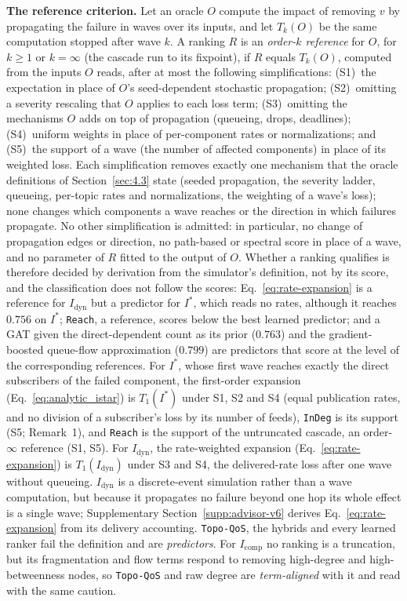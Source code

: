 \noindent\textbf{The reference criterion.} Let an oracle $O$ compute the impact of removing $v$ by propagating the failure in waves over its inputs, and let $T_k(O)$ be the same computation stopped after wave $k$. A ranking $R$ is an \emph{order-$k$ reference} for $O$, for $k \ge 1$ or $k = \infty$ (the cascade run to its fixpoint), if $R$ equals $T_k(O)$, computed from the inputs $O$ reads, after at most the following simplifications: (S1)~the expectation in place of $O$'s seed-dependent stochastic propagation; (S2)~omitting a severity rescaling that $O$ applies to each loss term; (S3)~omitting the mechanisms $O$ adds on top of propagation (queueing, drops, deadlines); (S4)~uniform weights in place of per-component rates or normalizations; and (S5)~the support of a wave (the number of affected components) in place of its weighted loss. Each simplification removes exactly one mechanism that the oracle definitions of Section~\ref{sec:4.3} state (seeded propagation, the severity ladder, queueing, per-topic rates and normalizations, the weighting of a wave's loss); none changes which components a wave reaches or the direction in which failures propagate. No other simplification is admitted: in particular, no change of propagation edges or direction, no path-based or spectral score in place of a wave, and no parameter of $R$ fitted to the output of $O$. Whether a ranking qualifies is therefore decided by derivation from the simulator's definition, not by its score, and the classification does not follow the scores: Eq.~\eqref{eq:rate-expansion} is a reference for $I_{\text{dyn}}$ but a predictor for $I^*$, which reads no rates, although it reaches $0.756$ on $I^*$; \texttt{Reach}, a reference, scores below the best learned predictor; and a GAT given the direct-dependent count as its prior ($0.763$) and the gradient-boosted queue-flow approximation ($0.799$) are predictors that score at the level of the corresponding references. For $I^*$, whose first wave reaches exactly the direct subscribers of the failed component, the first-order expansion (Eq.~\eqref{eq:analytic_istar}) is $T_1(I^*)$ under S1, S2 and S4 (equal publication rates, and no division of a subscriber's loss by its number of feeds), \texttt{InDeg} is its support (S5; Remark~1), and \texttt{Reach} is the support of the untruncated cascade, an order-$\infty$ reference (S1, S5). For $I_{\text{dyn}}$, the rate-weighted expansion (Eq.~\eqref{eq:rate-expansion}) is $T_1(I_{\text{dyn}})$ under S3 and S4, the delivered-rate loss after one wave without queueing. $I_{\text{dyn}}$ is a discrete-event simulation rather than a wave computation, but because it propagates no failure beyond one hop its whole effect is a single wave; Supplementary Section~\ref{supp:advisor-v6} derives Eq.~\eqref{eq:rate-expansion} from its delivery accounting. \texttt{Topo-QoS}, the hybrids and every learned ranker fail the definition and are \emph{predictors}. For $I_{\text{comp}}$ no ranking is a truncation, but its fragmentation and flow terms respond to removing high-degree and high-betweenness nodes, so \texttt{Topo-QoS} and raw degree are \emph{term-aligned} with it and read with the same caution.

